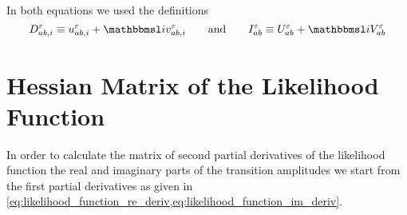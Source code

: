 In both equations we used the definitions
\begin{equation}
  D^\refl_{a b, i} \equiv u^\refl_{a b, i} + \i v^\refl_{a b, i}
  \qquad\text{and}\qquad
  I^\refl_{a b} \equiv U^\refl_{a b} + \i V^\refl_{a b}
\end{equation}


\section{Hessian Matrix of the Likelihood Function}
\label{sec:likelihood_hessian}

In order to calculate the matrix of second partial derivatives of the
likelihood function \wrt the real and imaginary parts of the
transition amplitudes we start from the first partial derivatives as
given in
\cref{eq:likelihood_function_re_deriv,eq:likelihood_function_im_deriv}.

